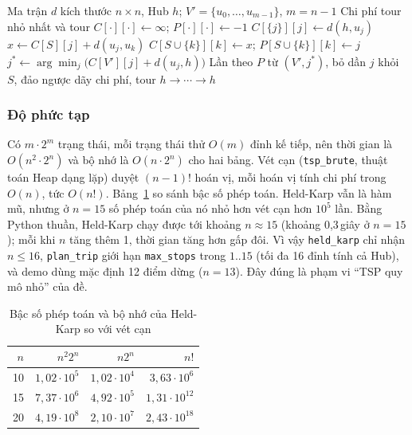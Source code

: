 \begin{algorithm}[t]
\caption{Held-Karp cho ATSP (\texttt{held\_karp})}\label{alg:hk}
\begin{algorithmic}[1]
\Require Ma trận $d$ kích thước $n \times n$, Hub $h$; $V' = \{u_0,\ldots,u_{m-1}\}$, $m = n-1$
\Ensure Chi phí tour nhỏ nhất và tour
\State $C[\cdot][\cdot] \gets \infty$; \quad $P[\cdot][\cdot] \gets -1$
  \State $C[\{j\}][j] \gets d(h, u_j)$
\EndFor
{} 
      \State $x \gets C[S][j] + d(u_j, u_k)$
        \State $C[S \cup \{k\}][k] \gets x$; \quad $P[S \cup \{k\}][k] \gets j$
      \EndIf
    \EndFor
  \EndFor
\EndFor
\State $j^* \gets \arg\min_j \bigl(C[V'][j] + d(u_j, h)\bigr)$
\State Lần theo $P$ từ $(V', j^*)$, bỏ dần $j$ khỏi $S$, đảo ngược dãy
\State \Return chi phí, tour $h \to \cdots \to h$
\end{algorithmic}
\end{algorithm}

\subsubsection{Độ phức tạp}
Có $m \cdot 2^m$ trạng thái, mỗi trạng thái thử $O(m)$ đỉnh kế tiếp, nên thời gian là $O(n^2 \cdot 2^n)$ và bộ nhớ là $O(n \cdot 2^n)$ cho hai bảng. Vét cạn (\texttt{tsp\_brute}, thuật toán Heap dạng lặp) duyệt $(n-1)!$ hoán vị, mỗi hoán vị tính chi phí trong $O(n)$, tức $O(n!)$. Bảng~\ref{tab:hk} so sánh bậc số phép toán. Held-Karp vẫn là hàm mũ, nhưng ở $n = 15$ số phép toán của nó nhỏ hơn vét cạn hơn $10^5$ lần. Bằng Python thuần, Held-Karp chạy được tới khoảng $n \approx 15$ (khoảng 0,3\,giây ở $n = 15$); mỗi khi $n$ tăng thêm 1, thời gian tăng hơn gấp đôi. Vì vậy \texttt{held\_karp} chỉ nhận $n \le 16$, \texttt{plan\_trip} giới hạn \texttt{max\_stops} trong $1..15$ (tối đa 16 đỉnh tính cả Hub), và demo dùng mặc định 12 điểm dừng ($n = 13$). Đây đúng là phạm vi ``TSP quy mô nhỏ'' của đề.

\begin{table}[t]
\centering
\caption{Bậc số phép toán và bộ nhớ của Held-Karp so với vét cạn}\label{tab:hk}
\begin{tabular}{@{}rrrr@{}}
\toprule
$n$ & $n^2 2^n$ & $n 2^n$ & $n!$ \\
\midrule
10 & $1{,}02 \cdot 10^{5}$ & $1{,}02 \cdot 10^{4}$ & $3{,}63 \cdot 10^{6}$ \\
15 & $7{,}37 \cdot 10^{6}$ & $4{,}92 \cdot 10^{5}$ & $1{,}31 \cdot 10^{12}$ \\
20 & $4{,}19 \cdot 10^{8}$ & $2{,}10 \cdot 10^{7}$ & $2{,}43 \cdot 10^{18}$ \\
\bottomrule
\end{tabular}
\end{table}

